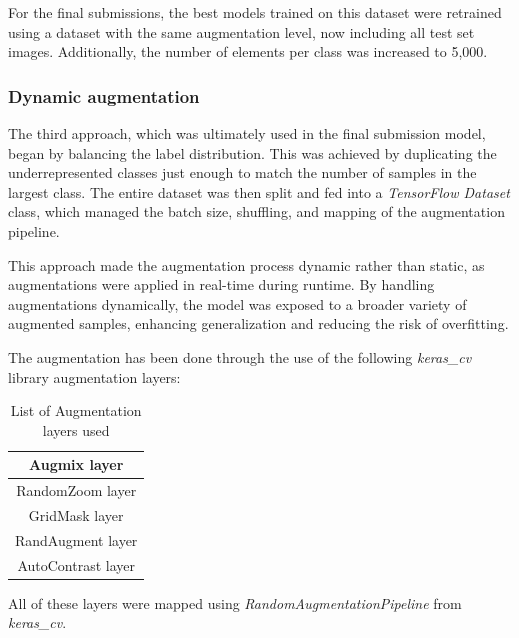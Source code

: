 \documentclass[11pt]{article}
\begin{document}
\begin{multicols}{2}
        For the final submissions, the best models trained on this dataset were retrained using a dataset with the same augmentation level, now including all test set images. 
        Additionally, the number of elements per class was increased to 5,000.
        
        \subsubsection{Dynamic augmentation}
        
        The third approach, which was ultimately used in the final submission model, began by balancing the label distribution.
        This was achieved by duplicating the underrepresented classes just enough to match the number of samples in the largest class.
        The entire dataset was then split and fed into a \textit{TensorFlow Dataset} class, which managed the batch size, shuffling, and mapping of the augmentation pipeline.
        
        This approach made the augmentation process dynamic rather than static, as augmentations were applied in real-time during runtime. 
        By handling augmentations dynamically, the model was exposed to a broader variety of augmented samples, enhancing generalization and reducing the risk of overfitting.
        
        The augmentation has been done through the use of the following \textit{keras\_cv} library augmentation layers:

        \begin{table}[H]
            \centering
            \setlength{\tabcolsep}{5pt}
            \caption{List of Augmentation layers used}
            \begin{tabular}{|c|}
                \hline
                Augmix layer \\
                \hline
                RandomZoom layer \\
                \hline
                GridMask layer \\
                \hline
                RandAugment layer \\
                \hline
                AutoContrast layer \\
                \hline
            \end{tabular}
            \label{tb:AugLayers}
        \end{table}
        
        All of these layers were mapped using \textit{RandomAugmentationPipeline} from \textit{keras\_cv}.
        

\end{multicols}
\end{document}
